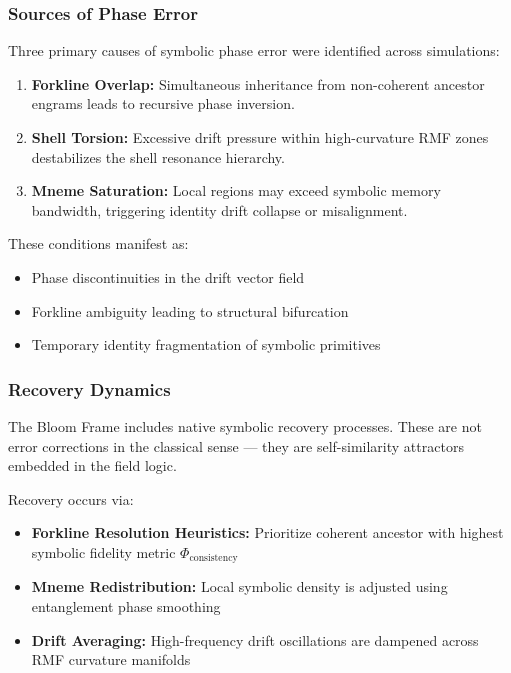 \documentclass[12pt]{article}
\begin{document}
\subsubsection{Sources of Phase Error}

Three primary causes of symbolic phase error were identified across simulations:

\begin{enumerate}[noitemsep]
  \item \textbf{Forkline Overlap:} Simultaneous inheritance from non-coherent ancestor engrams leads to recursive phase inversion.
  \item \textbf{Shell Torsion:} Excessive drift pressure within high-curvature RMF zones destabilizes the shell resonance hierarchy.
  \item \textbf{Mneme Saturation:} Local regions may exceed symbolic memory bandwidth, triggering identity drift collapse or misalignment.
\end{enumerate}

These conditions manifest as:

\begin{itemize}[noitemsep]
  \item Phase discontinuities in the drift vector field
  \item Forkline ambiguity leading to structural bifurcation
  \item Temporary identity fragmentation of symbolic primitives
\end{itemize}

\subsubsection{Recovery Dynamics}

The Bloom Frame includes native symbolic recovery processes. These are not error corrections in the classical sense — they are self-similarity attractors embedded in the field logic.

Recovery occurs via:

\begin{itemize}[noitemsep]
  \item \textbf{Forkline Resolution Heuristics:} Prioritize coherent ancestor with highest symbolic fidelity metric \( \Phi_\text{consistency} \)
  \item \textbf{Mneme Redistribution:} Local symbolic density is adjusted using entanglement phase smoothing
  \item \textbf{Drift Averaging:} High-frequency drift oscillations are dampened across RMF curvature manifolds
\end{itemize}
\end{document}

